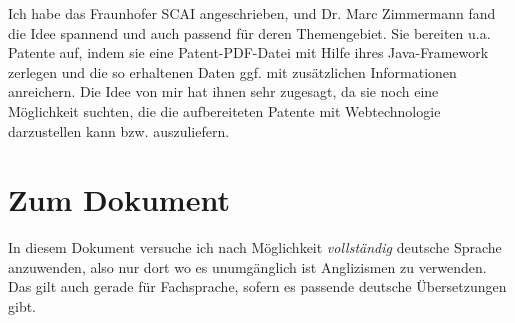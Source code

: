 Ich habe das Fraunhofer SCAI angeschrieben, und Dr. Marc Zimmermann fand
die Idee spannend und auch passend für deren Themengebiet. Sie bereiten u.a.
Patente auf, indem sie eine Patent-PDF-Datei mit Hilfe ihres Java-Framework
zerlegen und die so erhaltenen Daten ggf. mit zusätzlichen Informationen
anreichern. Die Idee von mir hat ihnen sehr zugesagt, da sie noch eine
Möglichkeit suchten, die die aufbereiteten Patente mit Webtechnologie
darzustellen kann bzw. auszuliefern.

\section{Zum Dokument}

In diesem Dokument versuche ich nach Möglichkeit \emph{vollständig}
deutsche Sprache anzuwenden, also nur dort wo es unumgänglich ist
Anglizismen zu verwenden. Das gilt auch gerade für Fachsprache, sofern es
passende deutsche Übersetzungen gibt.

